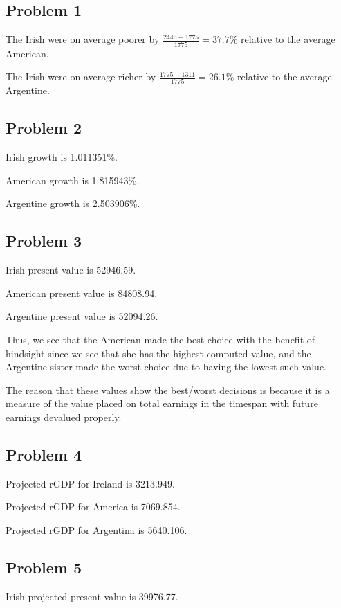 \documentclass[12pt,letterpaper]{article}
\theoremstyle{definition}
\begin{document}
\subsection*{Problem 1}

The Irish were on average poorer by $\frac{2445-1775}{1775} = 37.7\%$ relative to the
average American.

The Irish were on average richer by $\frac{1775-1311}{1775} = 26.1\%$ relative to the
average Argentine.

\subsection*{Problem 2}

Irish growth is  1.011351\%.

American growth is  1.815943\%.

Argentine growth is  2.503906\%.

\subsection*{Problem 3}

Irish present value is 52946.59.

American present value is 84808.94.

Argentine present value is 52094.26.

Thus, we see that the American made the best choice with the benefit of
hindsight since we see that she has the highest computed value, and the
Argentine sister made the worst choice due to having the lowest such value.

The reason that these values show the best/worst decisions is because it is a
measure of the value placed on total earnings in the timespan with future
earnings devalued properly.

\subsection*{Problem 4}

Projected rGDP for Ireland is 3213.949.

Projected rGDP for America is 7069.854.

Projected rGDP for Argentina is 5640.106.

\subsection*{Problem 5}

Irish projected present value is 39976.77.
\end{document}
